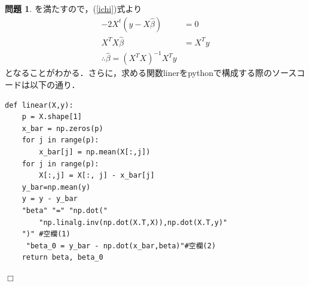 \documentclass[titlepage]{jsarticle}
\theoremstyle{definition}
\newtheorem{Ex}{問題}
\theoremstyle{mystyle} %
\renewcommand{\footnotesize}{\normalsize}
\def\qed{\hfill$\Box$}
\begin{document}
\begin{Ex}
を満たすので，(\ref{ichi})式より
\begin{align*}
-2X^t(y-X\hat{\beta}) &= 0\\
X^T X\hat{\beta} &= X^Ty\\
\therefore \hat{\beta} = (X^T X)^{-1}X^T y
\end{align*}
となることがわかる．さらに，求める関数linerをpythonで構成する際のソースコードは以下の通り．
\begin{lstlisting}[basicstyle = \ttfamily\footnotesize, frame = single]
def linear(X,y):
    p = X.shape[1]
    x_bar = np.zeros(p)
    for j in range(p):
        x_bar[j] = np.mean(X[:,j])
    for j in range(p):
        X[:,j] = X[:, j] - x_bar[j]
    y_bar=np.mean(y)
    y = y - y_bar
    "beta" "=" "np.dot("
        "np.linalg.inv(np.dot(X.T,X)),np.dot(X.T,y)"
    ")" #空欄(1) 
     "beta_0 = y_bar - np.dot(x_bar,beta)"#空欄(2)
    return beta, beta_0
\end{lstlisting}\qed\\
\end{Ex}
\end{document}
